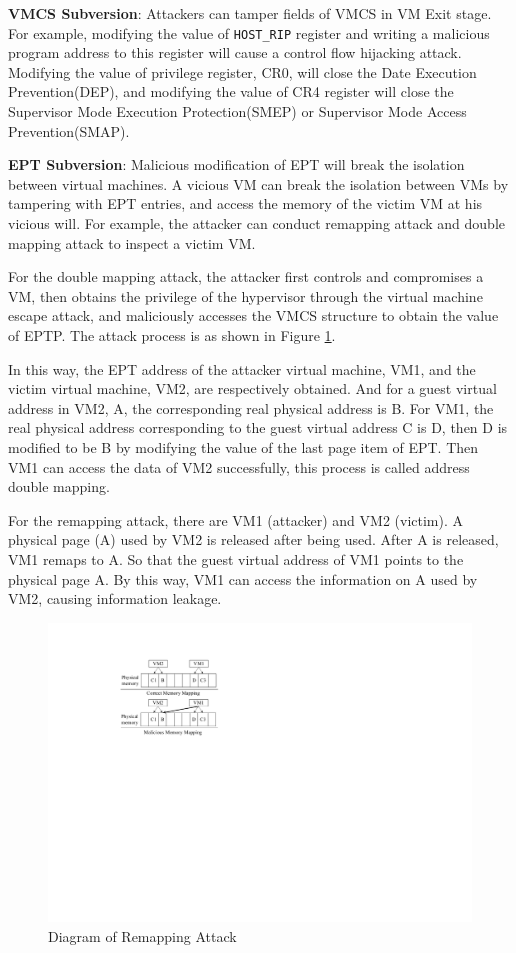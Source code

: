 \textbf{VMCS Subversion}:
Attackers can tamper fields of VMCS in VM Exit stage. For example, modifying the value of \verb|HOST_RIP| register and writing a malicious program address to this register will cause a control flow hijacking attack. Modifying the value of privilege register, CR0, will close the Date Execution Prevention(DEP), and modifying the value of CR4 register will close the Supervisor Mode Execution Protection(SMEP) or Supervisor Mode Access Prevention(SMAP)\cite{brookes2016exoshim}.


\textbf{EPT Subversion}: 
Malicious modification of EPT will break the isolation between virtual machines. A vicious VM can break the isolation between VMs by tampering with EPT entries, and access the memory of the victim VM at his vicious will. For example, the attacker can conduct remapping attack and double mapping attack to inspect a victim VM. 

For the double mapping attack, the attacker first controls and compromises a VM, then obtains the privilege of the hypervisor through the virtual machine escape attack, and maliciously accesses the VMCS structure to obtain the value of EPTP. The attack process is as shown in Figure \ref{pic:remap}. 

In this way, the EPT address of the attacker virtual machine, VM1, and the victim virtual machine, VM2, are respectively obtained. And for a guest virtual address in VM2, A, the corresponding real physical address is B. For VM1, the real physical address corresponding to the guest virtual address C is D, then D is modified to be B by modifying the value of the last page item of EPT. Then VM1 can access the data of VM2 successfully, this process is called address double mapping.

For the remapping attack, there are VM1 (attacker) and VM2 (victim). A physical page (A) used by VM2 is released after being used. After A is released, VM1 remaps to A. So that the guest virtual address of VM1 points to the physical page A. By this way, VM1 can access the information on A used by VM2, causing information leakage.


\begin{figure}
    \centering
    \includegraphics[width=0.8\linewidth]{IMG/remap.pdf}
    \caption{Diagram of Remapping Attack}
    \label{pic:remap}
\end{figure}

